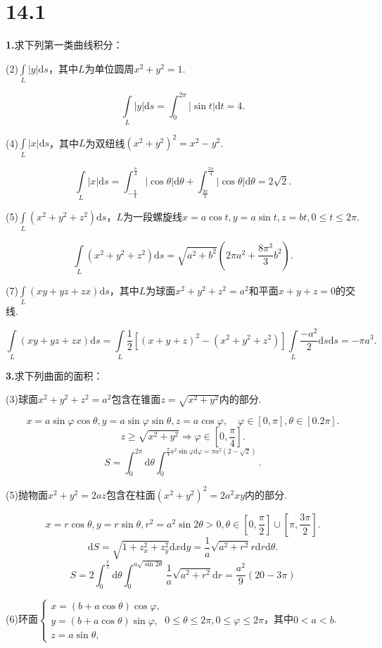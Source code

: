 \documentclass[12pt, a4paper]{article}
\newcommand{\dif}{\mathrm{d}}
\begin{document}
\section*{14.1}
\textbf{1.}求下列第一类曲线积分：

(2)\(\int\limits_L |y| \dif s\)，其中\(L\)为单位圆周\(x^2 + y^2 = 1\).

\[\int\limits_L |y| \dif s = \int_{0}^{2\pi} |\sin t| \dif t = 4.\]

(4)\(\int\limits_L |x| \dif s\)，其中\(L\)为双纽线\((x^2 + y^2)^2 = x^2 - y^2\).

\[\int\limits_L |x| \dif s = \int_{-\frac{\pi}{4}}^{\frac{\pi}{4}} |\cos\theta| \dif \theta + \int_{\frac{3\pi}{4}}^{\frac{5\pi}{4}} |\cos\theta| \dif \theta = 2\sqrt{2}.\]

(5)\(\int\limits_L (x^2 + y^2 + z^2) \dif s\)，\(L\)为一段螺旋线\(x = a\cos t, y = a\sin t, z = bt, 0 \leq t \leq 2\pi\).

\[\int\limits_L (x^2 + y^2 + z^2) \dif s = \sqrt{a^2 + b^2}\left(2\pi a^2 + \frac{8\pi^3}{3}b^2\right).\]

(7)\(\int\limits_L (xy + yz + zx) \dif s\)，其中\(L\)为球面\(x^2 + y^2 + z^2 = a^2\)和平面\(x + y + z = 0\)的交线.

\[\int\limits_L (xy + yz + zx) \dif s = \int\limits_L \frac{1}{2}\left[(x + y + z)^2 - (x^2 + y^2 + z^2)\right] \int\limits_L \frac{-a^2}{2} \dif s\dif s = -\pi a^3.\]

\textbf{3.}求下列曲面的面积：

(3)球面\(x^2 + y^2 + z^2 = a^2\)包含在锥面\(z = \sqrt{x^2 + y^2}\)内的部分.

\[x = a\sin\varphi\cos\theta, y = a\sin\varphi\sin\theta, z = a\cos\varphi, \quad \varphi \in [0, \pi], \theta \in [0. 2\pi].\]
\[z \geq \sqrt{x^2 + y^2} \Rightarrow \varphi \in \left[0, \frac{\pi}{4}\right].\]
\[S = \int_{0}^{2\pi} \dif \theta \int_{0}^{\frac{\pi}{4} a^2\sin\varphi \dif \varphi = \pi a^2(2 - \sqrt{2})}.\]

(5)抛物面\(x^2 + y^2 = 2az\)包含在柱面\((x^2 + y^2)^2 = 2a^2xy\)内的部分.

\[x = r\cos\theta, y = r\sin\theta, r^2 = a^2\sin 2\theta > 0, \theta \in \left[0, \frac{\pi}{2}\right] \cup \left[\pi, \frac{3\pi}{2}\right].\]
\[\dif S = \sqrt{1 + z_x^2 + z_y^2} \dif x \dif y = \frac{1}{a}\sqrt{a^2 + r^2}r \dif r \dif \theta.\]
\[S = 2\int_{0}^{\frac{\pi}{2}} \dif \theta \int_{0}^{a\sqrt{\sin 2\theta}} \frac{1}{a}\sqrt{a^2 + r^2} \dif r = \frac{a^2}{9}(20 - 3\pi)\]

(6)环面\(\begin{cases}
x = (b + a\cos\theta)\cos\varphi, \\
y = (b + a\cos\theta)\sin\varphi, \\
z = a\sin\theta,
\end{cases} 0 \leq \theta \leq 2\pi, 0 \leq \varphi \leq 2\pi\)，其中\(0 < a < b\).
\end{document}
